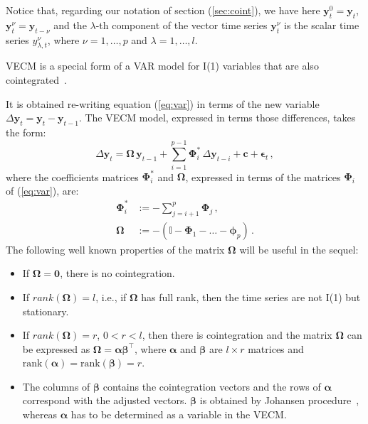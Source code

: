 \documentclass[twocolumn]{svjour3}          %
\begin{document}
Notice that, regarding our notation of section (\ref{sec:coint}),
we have here 
$\mathbf{y}_t^0 = \mathbf{y}_t$,
$\mathbf{y}_t^\nu = \mathbf{y}_{t-\nu}$ and
the $\lambda$-th component of the vector time series $\mathbf{y}_t^\nu$
is the scalar time series $y_{\lambda,t}^\nu$, where $\nu=1,\dots,p$ and
$\lambda=1,\dots,l$.

VECM is a special form of a VAR model for I(1) variables that are also
cointegrated~\cite{banerjee1993}.

It is obtained re-writing equation (\ref{eq:var}) in terms of the new
variable $\Delta\mathbf{y}_t=\mathbf{y}_t-\mathbf{y}_{t-1}$.
The VECM model, expressed in terms those differences, takes the form:
\begin{equation}\label{eq:vec}
\Delta \mathbf{y}_t 
= \boldsymbol{\Omega}\,\mathbf{y}_{t-1}
  + \sum_{i=1}^{p-1} \boldsymbol{\Phi}_i^*\,\Delta\mathbf{y}_{t-i}
  + \mathbf{c} + \boldsymbol{\epsilon}_t\,,
\end{equation}
\noindent
where the coefficients matrices $\boldsymbol{\Phi}_i^*$ and 
$\boldsymbol{\Omega}$, expressed in terms of the matrices
$\boldsymbol{\Phi}_i$ of (\ref{eq:var}), are:
\begin{align*}
\boldsymbol{\Phi}_i^* 
&:= -\sum_{j=i+1}^{p}\boldsymbol{\Phi}_j\,, \\
\boldsymbol{\Omega}
&:= -\left( \mathbb{I} - \boldsymbol{\Phi}_1 - \dots 
    - \boldsymbol{\phi}_p \right)\,. 
\end{align*}
The following well known properties of the matrix $\boldsymbol{\Omega}$
\cite{johansen1995} will be useful in the sequel:
\begin{itemize}
\item
If $\boldsymbol{\Omega} = \mathbf{0}$, there is no cointegration.
\item 
If $rank(\boldsymbol{\Omega})=l$, i.e., if $\boldsymbol{\Omega}$ has
full rank, then the time series are not I(1) but stationary.
\item
If $rank(\boldsymbol{\Omega})=r$, $0<r<l$, then there is cointegration
and the matrix $\boldsymbol{\Omega}$ can be expressed as
$\boldsymbol{\Omega}=\boldsymbol{\alpha\beta}^\top$, where $\boldsymbol{\alpha}$
and $\boldsymbol{\beta}$ are
$l\times r$ matrices and
$\text{rank}(\boldsymbol{\alpha})=\text{rank}(\boldsymbol{\beta})=r$.
\item
The columns of $\boldsymbol{\beta}$ contains the cointegration vectors and the rows of
$\boldsymbol{\alpha}$ correspond with the adjusted vectors. 
$\boldsymbol{\beta}$ is obtained by Johansen procedure~\cite{johansen1988},
whereas $\boldsymbol{\alpha}$ has to be determined as a variable in the VECM.
\end{itemize}
\end{document}

